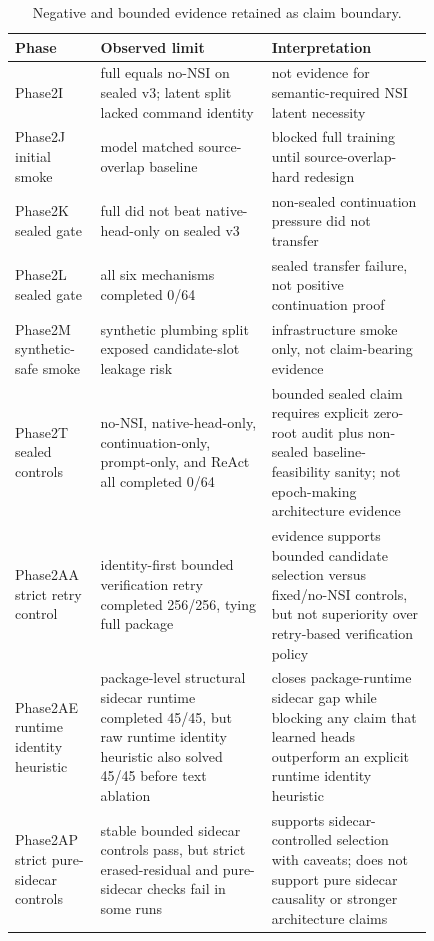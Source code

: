 \begin{table}[ht]
\centering
\tiny
\setlength{\tabcolsep}{1pt}
\caption{Negative and bounded evidence retained as claim boundary.}
\label{tab:negative-evidence}
\begin{tabular}{@{}>{\raggedright\arraybackslash}p{0.13\linewidth}>{\raggedright\arraybackslash}p{0.36\linewidth}>{\raggedright\arraybackslash}p{0.34\linewidth}@{}}
\toprule
Phase & Observed limit & Interpretation \\
\midrule
Phase2I & full equals no-NSI on sealed v3; latent split lacked command identity & not evidence for semantic-required NSI latent necessity \\
Phase2J initial smoke & model matched source-overlap baseline & blocked full training until source-overlap-hard redesign \\
Phase2K sealed gate & full did not beat native-head-only on sealed v3 & non-sealed continuation pressure did not transfer \\
Phase2L sealed gate & all six mechanisms completed 0/64 & sealed transfer failure, not positive continuation proof \\
Phase2M synthetic-safe smoke & synthetic plumbing split exposed candidate-slot leakage risk & infrastructure smoke only, not claim-bearing evidence \\
Phase2T sealed controls & no-NSI, native-head-only, continuation-only, prompt-only, and ReAct all completed 0/64 & bounded sealed claim requires explicit zero-root audit plus non-sealed baseline-feasibility sanity; not epoch-making architecture evidence \\
Phase2AA strict retry control & identity-first bounded verification retry completed 256/256, tying full package & evidence supports bounded candidate selection versus fixed/no-NSI controls, but not superiority over retry-based verification policy \\
Phase2AE runtime identity heuristic & package-level structural sidecar runtime completed 45/45, but raw runtime identity heuristic also solved 45/45 before text ablation & closes package-runtime sidecar gap while blocking any claim that learned heads outperform an explicit runtime identity heuristic \\
Phase2AP strict pure-sidecar controls & stable bounded sidecar controls pass, but strict erased-residual and pure-sidecar checks fail in some runs & supports sidecar-controlled selection with caveats; does not support pure sidecar causality or stronger architecture claims \\

\end{tabular}
\end{table}
